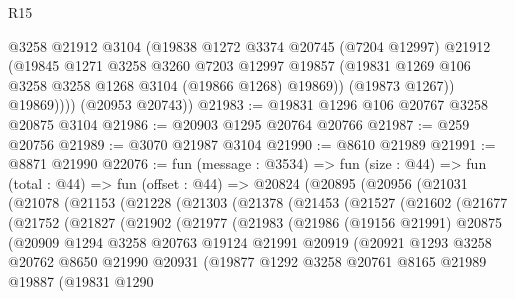 \begin{lexlean}{R15}
\begin{coremodule}
              @3258
              @21912
              @3104
              (@19838
                @1272
                @3374
                @20745
                (@7204 @12997)
                @21912
                (@19845
                  @1271
                  @3258
                  @3260
                  @7203
                  @12997
                  @19857
                  (@19831 @1269 @106 @3258 @3258 @1268 @3104 (@19866 @1268) @19869))
                (@19873 @1267))
              @19869))))
      (@20953 @20743))
@21983 := @19831 @1296 @106 @20767 @3258 @20875 @3104
@21986 := @20903 @1295 @20764 @20766
@21987 := @259 @20756
@21989 := @3070 @21987 @3104
@21990 := @8610 @21989
@21991 := @8871 @21990
@22076 := fun (message : @3534) =>
  fun (size : @44) =>
  fun (total : @44) =>
  fun (offset : @44) =>
  @20824
    (@20895
      (@20956
        (@21031
          (@21078
            (@21153
              (@21228
                (@21303
                  (@21378
                    (@21453
                      (@21527
                        (@21602
                          (@21677
                            (@21752
                              (@21827
                                (@21902
                                  (@21977
                                    (@21983
                                      (@21986
                                        (@19156 @21991)
                                        @20875
                                        (@20909
                                          @1294
                                          @3258
                                          @20763
                                          @19124
                                          @21991
                                          @20919
                                          (@20921
                                            @1293
                                            @3258
                                            @20762
                                            @8650
                                            @21990
                                            @20931
                                            (@19877
                                              @1292
                                              @3258
                                              @20761
                                              @8165
                                              @21989
                                              @19887
                                              (@19831
                                                @1290

\end{coremodule}
\end{lexlean}
